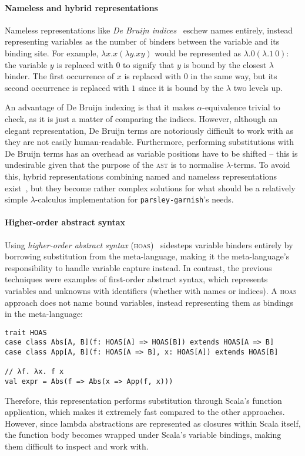 \documentclass[../../../main.tex]{subfiles}
\begin{document}
\paragraph{Nameless and hybrid representations}
Nameless representations like \emph{De Bruijn indices}~\cite{debruijn_lambda_1972} eschew names entirely, instead representing variables as the number of binders between the variable and its binding site.
For example, $\lambda x. x(\lambda y. x y)$ would be represented as $\lambda. 0(\lambda. 1\ 0)$: the variable $y$ is replaced with $0$ to signify that $y$ is bound by the closest $\lambda$ binder.
The first occurrence of $x$ is replaced with $0$ in the same way, but its second occurrence is replaced with $1$ since it is bound by the $\lambda$ two levels up.

An advantage of De Bruijn indexing is that it makes $\alpha$-equivalence trivial to check, as it is just a matter of comparing the indices.
However, although an elegant representation, De Bruijn terms are notoriously difficult to work with as they are not easily human-readable.
Furthermore, performing substitutions with De Bruijn terms has an overhead as variable positions have to be shifted -- this is undesirable given that the purpose of the \textsc{ast} is to normalise $\lambda$-terms.
To avoid this, hybrid representations combining named and nameless representations exist~\cite{mcbride_imnotanumber_2004,chargueraud_locally_2012}, but they become rather complex solutions for what should be a relatively simple $\lambda$-calculus implementation for \texttt{parsley-garnish}'s needs.

\paragraph{Higher-order abstract syntax}
Using \emph{higher-order abstract syntax} (\textsc{hoas})~\cite{pfenning_hoas_1988} sidesteps variable binders entirely by borrowing substitution from the meta-language, making it the meta-language's responsibility to handle variable capture instead.
In contrast, the previous techniques were examples of first-order abstract syntax, which represents variables and unknowns with identifiers (whether with names or indices).
A \textsc{hoas} approach does not name bound variables, instead representing them as bindings in the meta-language:

\begin{verbatim}
trait HOAS
case class Abs[A, B](f: HOAS[A] => HOAS[B]) extends HOAS[A => B]
case class App[A, B](f: HOAS[A => B], x: HOAS[A]) extends HOAS[B]

// λf. λx. f x
val expr = Abs(f => Abs(x => App(f, x)))
\end{verbatim}
%
Therefore, this representation performs substitution through Scala's function application, which makes it extremely fast compared to the other approaches.
However, since lambda abstractions are represented as closures within Scala itself, the function body becomes wrapped under Scala's variable bindings, making them difficult to inspect and work with.
\end{document}
